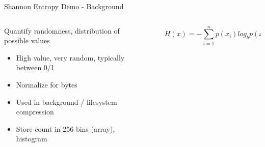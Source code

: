 \documentclass[aspectratio=169, notes]{beamer}
\begin{document}
\begin{frame}{Shannon Entropy Demo - Background}
        \begin{columns}
            \begin{column}{0.50\textwidth}
                \footnotesize
                Quantify randomness, distribution of possible values
                \begin{itemize}
                    \item High value, very random, typically between 0/1
                    \item Normalize for bytes
                    \item Used in background / filesystem compression
                    \item Store count in 256 bins (array), histogram
                \end{itemize}
            \end{column}
            \begin{column}{0.50\textwidth}
                \begingroup
                \begin{figure}
                    \centering
                    $$H(x)=-\sum_{i=1}^{n}p(x_i)log_bp(x_i)$$
                \end{figure}
                \endgroup
            \end{column}
        \end{columns}
\end{frame}
\end{document}
